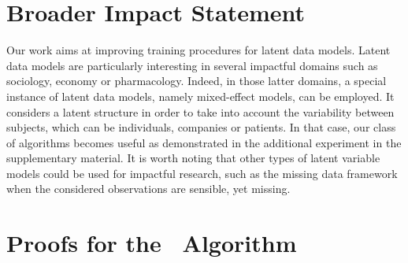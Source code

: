 \documentclass[11pt]{article}
\theoremstyle{t}
\begin{document}
\newpage
\section{Broader Impact Statement}
Our work aims at improving training procedures for latent data models. 
Latent data models are particularly interesting in several impactful domains such as sociology, economy or pharmacology.
Indeed, in those latter domains, a special instance of latent data models, namely mixed-effect models, can be employed. 
It considers a latent structure in order to take into account the variability between subjects, which can be individuals, companies or patients.
In that case, our class of algorithms becomes useful as demonstrated in the additional experiment in the supplementary material.
It is worth noting that other types of latent variable models could be used for impactful research, such as the missing data framework when the considered observations are sensible, yet missing.

\linespread{1.1}
\normalsize





\linespread{1}
\newpage


\appendix

\section{Proofs for the \ISAEM\ Algorithm}
\end{document}
